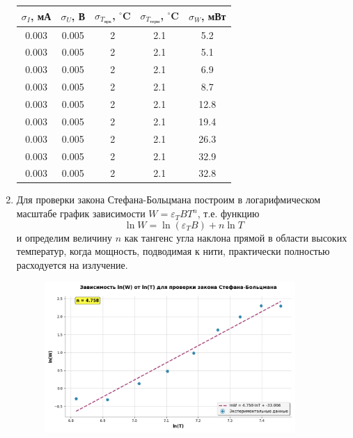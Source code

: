 \documentclass[a4paper,12pt]{article}
\begin{document}
\begin{enumerate}
    \begin{table}[h!]
    \centering
    \begin{tabular}{||c|c|c|c|c||}
    \hline
    $\sigma_I$, мА & $\sigma_U$, В & $\sigma_{T_{\text{ярк}}}$, $^\circ$C & $\sigma_{T_{\text{терм}}}$, $^\circ$C & $\sigma_W$, мВт \\
    \hline
    \hline
    0.003 & 0.005 & 2 & 2.1 & 5.2 \\
    0.003 & 0.005 & 2 & 2.1 & 5.1 \\
    0.003 & 0.005 & 2 & 2.1 & 6.9 \\
    0.003 & 0.005 & 2 & 2.1 & 8.7 \\
    0.003 & 0.005 & 2 & 2.1 & 12.8 \\
    0.003 & 0.005 & 2 & 2.1 & 19.4 \\
    0.003 & 0.005 & 2 & 2.1 & 26.3 \\
    0.003 & 0.005 & 2 & 2.1 & 32.9 \\
    0.003 & 0.005 & 2 & 2.1 & 32.8 \\
    \hline
    \end{tabular}
    \end{table}
    
    \item Для проверки закона Стефана-Больцмана построим в логарифмическом масштабе график зависимости $W = \varepsilon_TBT^n$, т.е. функцию
    $$
    \ln{W} = \ln{(\varepsilon_TB)} + n\ln{T}
    $$
    и определим величину $n$ как тангенс угла наклона прямой в области высоких температур, когда мощность, подводимая к нити, практически полностью расходуется на излучение.

    \begin{figure}[h]
    \centering
    \includegraphics[width=0.9\textwidth]{graph1.png}
    \end{figure}


\end{enumerate}
\end{document}
